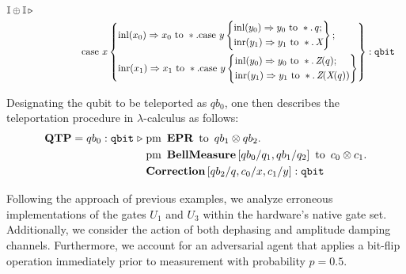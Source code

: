 \begin{example}
\begin{align*}
        \mathbb{I} \oplus \mathbb{I} \, \triangleright \\
    &\hspace{50pt} \text{case } x \left\{ 
        \begin{aligned} 
          & \mathrm{inl} (x_{0}) \Rightarrow x_0 \text{ to } \ast. \text{case } y \left\{
                \begin{aligned}
                  &\mathrm{inl} (y_{0})  \Rightarrow  y_0 \text{ to } \ast.
                        \, q; \\
                  &\mathrm{inr} (y_{1}) \Rightarrow y_1 \text{ to } \ast. \, \emph{X}
                \end{aligned} \right\}; \\
          & \mathrm{inr} (x_{1})  \Rightarrow x_1 \text{ to } \ast. \text{case } y \left\{
                \begin{aligned}
                  &  \mathrm{inl} (y_{0})  \Rightarrow
        y_0 \text{ to } \ast. \, \emph{Z}(q); \\
                  &\mathrm{inr} (y_{1}) \Rightarrow{} y_1 \text{ to } \ast. \, \emph{Z}
(\emph{X}(q))
                \end{aligned} \right\}
        \end{aligned}\right\} : \mathtt{qbit}
\end{align*}

Designating the qubit to be teleported as $qb_0$, one then describes the
teleportation procedure in $\lambda$-calculus as follows:
 \begin{align*}
  \textbf{QTP} = qb_{0}: \mathtt{qbit}\hspace{3 pt} \triangleright \hspace{3 pt} & \text{pm} \hspace{5pt} \textbf{EPR} \hspace{5pt} \text{to} \hspace{5pt}  qb_{1} \otimes qb_{2}.  \notag \\
     & \text{pm}\hspace{5pt} \textbf{BellMeasure}\, [qb_0/q_1,qb_{1}/q_2] \hspace{5pt}  \text{to} \hspace{5pt} c_{0}\otimes c_{1} . \notag \\
     & \textbf{Correction}\, [qb_{2}/q,c_{0}/x, c_{1}/y] 
     : \mathtt{qbit} 
 \end{align*}


 Following the approach of previous examples, we analyze erroneous implementations of the gates $U_1$ and $U_3$ within the hardware’s native gate set. Additionally, we consider the action of both dephasing and amplitude damping channels. Furthermore, we account for an adversarial agent that applies a bit-flip operation immediately prior to measurement with probability $ p = 0.5 $.  


\end{example}
